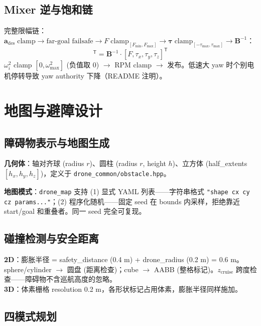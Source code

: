 \documentclass[12pt,a4paper]{article}
\begin{document}
\subsection{Mixer 逆与饱和链}

完整限幅链：$\mathbf{a}_{\text{des}}\;\text{clamp} \to \text{far-goal failsafe} \to F\;\text{clamp}_{[F_{\min},F_{\max}]} \to \boldsymbol{\tau}\;\text{clamp}_{[-\tau_{\max},\tau_{\max}]} \to \mathbf{B}^{-1}$：
\begin{equation}
  [\omega_1^2,\dots,\omega_4^2]^{\mathsf{T}}
    = \mathbf{B}^{-1} \cdot [F,\tau_x,\tau_y,\tau_z]^{\mathsf{T}}
\end{equation}
$\omega_i^2$ clamp $[0, \omega^2_{\max}]$ (负值取 0)
$\to$ RPM clamp $\to$ 发布。低速大 yaw 时个别电机停转导致 yaw authority 下降（README 注明）。


\section{地图与避障设计}

\subsection{障碍物表示与地图生成}

\textbf{几何体}：轴对齐球 (radius $r$)、圆柱 (radius $r$, height $h$)、立方体 (half\_extents $[h_x,h_y,h_z]$)，定义于 \texttt{drone\_common/obstacle.hpp}。

\textbf{地图模式}：\texttt{drone\_map} 支持 (1) 显式 YAML 列表——字符串格式 \texttt{"shape cx cy cz params..."}；(2) 程序化随机——固定 seed 在 bounds 内采样，拒绝靠近 start/goal 和重叠者。同一 seed 完全可复现。

\subsection{碰撞检测与安全距离}

\textbf{2D}：膨胀半径 = safety\_distance (0.4 m) + drone\_radius (0.2 m) = 0.6 m。sphere/cylinder $\to$ 圆盘 (距离检查)；cube $\to$ AABB (整格标记)。$z_{\text{cruise}}$ 跨度检查——障碍物不含巡航高度的忽略。\\
\textbf{3D}：体素栅格 resolution 0.2 m，各形状标记占用体素，膨胀半径同样施加。

\subsection{四模式规划}
\end{document}
